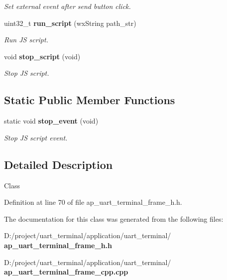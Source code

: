 \begin{DoxyCompactItemize}
\begin{DoxyCompactList}\small\item\em Set external event after send button click. \end{DoxyCompactList}\item 
uint32\+\_\+t \textbf{ run\+\_\+script} (wx\+String path\+\_\+str)
\begin{DoxyCompactList}\small\item\em Run JS script. \end{DoxyCompactList}\item 
void \textbf{ stop\+\_\+script} (void)
\begin{DoxyCompactList}\small\item\em Stop JS script. \end{DoxyCompactList}\end{DoxyCompactItemize}
\subsection*{Static Public Member Functions}
\begin{DoxyCompactItemize}
\item 
static void \textbf{ stop\+\_\+event} (void)
\begin{DoxyCompactList}\small\item\em Stop JS script event. \end{DoxyCompactList}\end{DoxyCompactItemize}


\subsection{Detailed Description}
Class 

Definition at line 70 of file ap\+\_\+uart\+\_\+terminal\+\_\+frame\+\_\+h.\+h.



The documentation for this class was generated from the following files\+:\begin{DoxyCompactItemize}
\item 
D\+:/project/uart\+\_\+terminal/application/uart\+\_\+terminal/\textbf{ ap\+\_\+uart\+\_\+terminal\+\_\+frame\+\_\+h.\+h}\item 
D\+:/project/uart\+\_\+terminal/application/uart\+\_\+terminal/\textbf{ ap\+\_\+uart\+\_\+terminal\+\_\+frame\+\_\+cpp.\+cpp}\end{DoxyCompactItemize}
